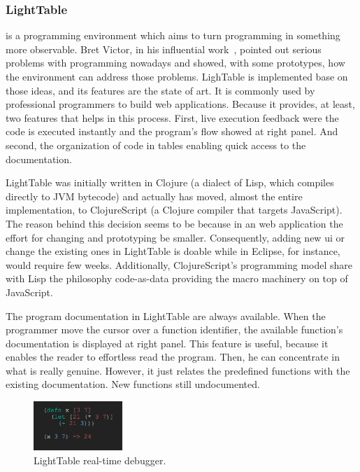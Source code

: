 \subsubsection{LightTable\protect\footnotemark[\ref{lt:note}]} is a programming environment which aims to turn programming in something more observable. Bret Victor, in his influential work~\cite{inventingPrin,learnableProg}, pointed out serious problems with programming nowadays and showed, with some prototypes, how the environment can address those problems. LighTable is implemented base on those ideas, and its features are the state of art. It is commonly used by professional programmers to build web applications. Because it provides, at least, two features that helps in this process. First, live execution feedback were the code is executed instantly and the program's flow showed at right panel. And second, the organization of code in tables enabling quick access to the documentation.

LightTable was initially written in Clojure (a dialect of Lisp, which compiles directly to JVM bytecode) and actually has moved, almost the entire implementation, to ClojureScript (a Clojure compiler that targets JavaScript). The reason behind this decision seems to be because in an web application the effort for changing and prototyping be smaller. Consequently, adding new \ac{ui} or change the existing ones in LightTable is doable while in Eclipse, for instance, would require few weeks. Additionally, ClojureScript's programming model share with Lisp the philosophy code-as-data providing the macro machinery on top of JavaScript.

The program documentation in LightTable are always available. When the programmer move the cursor over a function identifier, the available function's documentation is displayed at right panel. This feature is useful, because it enables the reader to effortless read the program. Then, he can concentrate in what is really genuine. However, it just relates the predefined functions with the existing documentation. New functions still undocumented. 

\begin{figure}
  \vspace{-25pt}
  \begin{center}
    \includegraphics[width=0.3\textwidth]{img/eval-close}
  \end{center}
  \vspace{-20pt}
 \caption{LightTable real-time debugger.}  
  \vspace{-20pt}
    \label{fig:lt2}
\end{figure}

